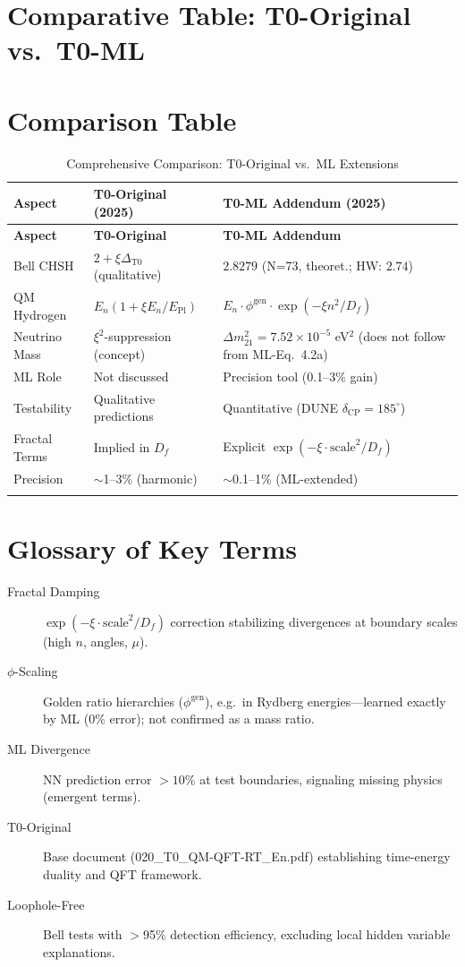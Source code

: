 	
	\section{Comparative Table: T0-Original vs.~T0-ML}
	
	\section*{Comparison Table}
	\begin{longtable}{p{2.4cm}p{4.0cm}p{4.0cm}}
		\toprule
		\textbf{Aspect} & \textbf{T0-Original (2025)} & \textbf{T0-ML Addendum (2025)} \\
		\midrule
		\endfirsthead
		\toprule
		\textbf{Aspect} & \textbf{T0-Original} & \textbf{T0-ML Addendum} \\
		\midrule
		\endhead
		
		Bell CHSH & $2 + \xi\Delta_{\text{T0}}$ (qualitative) & $2.8279$ (N=73, theoret.; HW: $2.74$) \\
		QM Hydrogen & $E_n(1+\xi E_n/E_{\text{Pl}})$ & $E_n \cdot \phi^{\text{gen}} \cdot \exp(-\xi n^2/D_f)$ \\
		Neutrino Mass & $\xi^2$-suppression (concept) & $\Delta m_{21}^2=7.52\times10^{-5}$ eV$^2$ (does not follow from ML-Eq.~4.2a) \\
		ML Role & Not discussed & Precision tool (0.1--3\% gain) \\
		Testability & Qualitative predictions & Quantitative (DUNE $\delta_{\text{CP}}=185^\circ$) \\
		Fractal Terms & Implied in $D_f$ & Explicit $\exp(-\xi \cdot \text{scale}^2/D_f)$ \\
		Precision & $\sim$1--3\% (harmonic) & $\sim$0.1--1\% (ML-extended) \\
		\bottomrule
		\caption{Comprehensive Comparison: T0-Original vs.~ML Extensions}
	\end{longtable}
	
	\section{Glossary of Key Terms}
	
	\begin{description}
		\item[Fractal Damping] $\exp(-\xi \cdot \text{scale}^2/D_f)$ correction stabilizing divergences at boundary scales (high $n$, angles, $\mu$).
		\item[$\phi$-Scaling] Golden ratio hierarchies ($\phi^{\text{gen}}$), e.g.\ in Rydberg energies---learned exactly by ML (0\% error); not confirmed as a mass ratio.
		\item[ML Divergence] NN prediction error $>10\%$ at test boundaries, signaling missing physics (emergent terms).
		\item[T0-Original] Base document (020\_T0\_QM-QFT-RT\_En.pdf) establishing time-energy duality and QFT framework.
		\item[Loophole-Free] Bell tests with $>$95\% detection efficiency, excluding local hidden variable explanations.
	\end{description}
	
